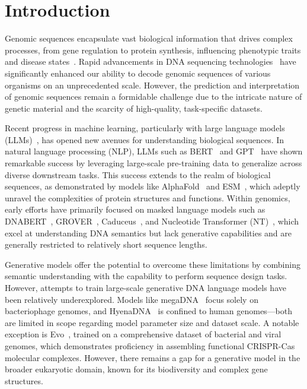 \section{Introduction}
Genomic sequences encapsulate vast biological information that drives complex processes, from gene regulation to protein synthesis, influencing phenotypic traits and disease states~\cite{bucleotide-sequence,bioinformatics-and-functional-genomics}. Rapid advancements in DNA sequencing technologies~\cite{next-generation-dna-sequencing} have significantly enhanced our ability to decode genomic sequences of various organisms on an unprecedented scale. However, the prediction and interpretation of genomic sequences remain a formidable challenge due to the intricate nature of genetic material and the scarcity of high-quality, task-specific datasets.

Recent progress in machine learning, particularly with large language models (LLMs)~\cite{llms-survey}, has opened new avenues for understanding biological sequences. In natural language processing (NLP), LLMs such as BERT~\cite{BERT} and GPT~\cite{GPT4} have shown remarkable success by leveraging large-scale pre-training data to generalize across diverse downstream tasks. This success extends to the realm of biological sequences, as demonstrated by models like AlphaFold~\cite{AlphaFold2,AlphaFold3} and ESM~\cite{esm2,esm3}, which adeptly unravel the complexities of protein structures and functions. Within genomics, early efforts have primarily focused on masked language models such as DNABERT~\cite{DNABERT,DNABERT-2}, GROVER~\cite{GROVER}, Caduceus~\cite{Caduceus}, and Nucleotide Transformer (NT)~\cite{nucleotide-transformer}, which excel at understanding DNA semantics but lack generative capabilities and are generally restricted to relatively short sequence lengths.

Generative models offer the potential to overcome these limitations by combining semantic understanding with the capability to perform sequence design tasks. However, attempts to train large-scale generative DNA language models have been relatively underexplored. Models like megaDNA~\cite{megaDNA} focus solely on bacteriophage genomes, and HyenaDNA~\cite{HyenaDNA} is confined to human genomes—both are limited in scope regarding model parameter size and dataset scale. A notable exception is Evo~\cite{Evo}, trained on a comprehensive dataset of bacterial and viral genomes, which demonstrates proficiency in assembling functional CRISPR-Cas molecular complexes. However, there remains a gap for a generative model in the broader eukaryotic domain, known for its biodiversity and complex gene structures.

